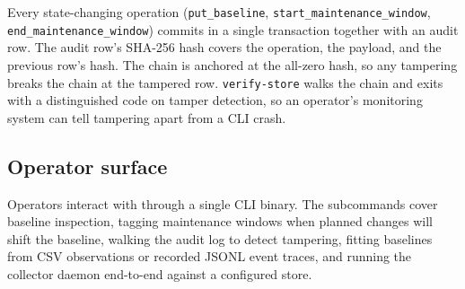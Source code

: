 Every state-changing operation (\texttt{put\_baseline},
\texttt{start\_maintenance\_window}, \texttt{end\_maintenance\_window})
commits in a single transaction together with an audit row. The
audit row's SHA-256 hash covers the operation, the payload, and the
previous row's hash. The chain is anchored at the all-zero hash, so
any tampering breaks the chain at the tampered row.
\texttt{verify-store} walks the chain and exits with a distinguished
code on tamper detection, so an operator's monitoring system can
tell tampering apart from a CLI crash.

\subsection{Operator surface}

Operators interact with \chronosynd{} through a single CLI binary.
The subcommands cover baseline inspection, tagging maintenance
windows when planned changes will shift the baseline, walking the
audit log to detect tampering, fitting baselines from CSV
observations or recorded JSONL event traces, and running the
collector daemon end-to-end against a configured store.
